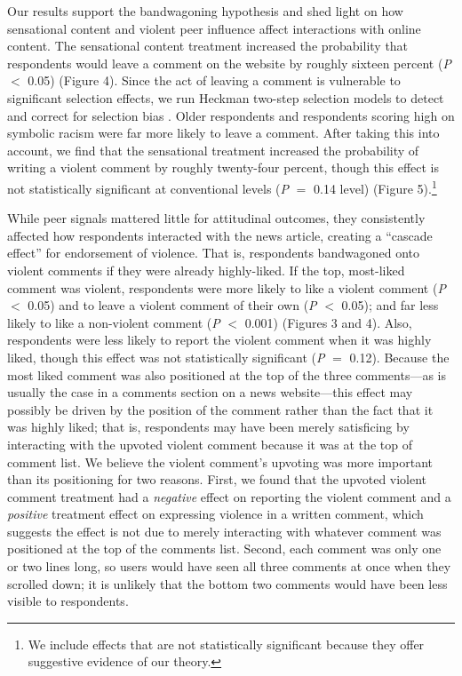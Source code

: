 \documentclass[12pt, letterpaper]{article}
\begin{document}
Our results support the bandwagoning hypothesis and shed light on how sensational content and violent peer influence affect interactions with online content. The sensational content treatment increased the probability that respondents would leave a comment on the website by roughly sixteen percent (\textit{P} $<$ 0.05) (Figure 4). Since the act of leaving a comment is vulnerable to significant selection effects, we run Heckman two-step selection models to detect and correct for selection bias \citep{heckman1979sample}. Older respondents and respondents scoring high on symbolic racism were far more likely to leave a comment. After taking this into account, we find that the sensational treatment increased the probability of writing a violent comment by roughly twenty-four percent, though this effect is not statistically significant at conventional levels (\textit{P} $=$ 0.14 level) (Figure 5).\footnote{We include effects that are not statistically significant because they offer suggestive evidence of our theory.}

While peer signals mattered little for attitudinal outcomes, they consistently affected how respondents interacted with the news article, creating a ``cascade effect'' \citep{bikhchandani1992theory} for endorsement of violence. That is, respondents bandwagoned onto violent comments if they were already highly-liked. If the top, most-liked comment was violent, respondents were more likely to like a violent comment (\textit{P} $<$ 0.05) and to leave a violent comment of their own (\textit{P} $<$ 0.05); and far less likely to like a non-violent comment (\textit{P} $<$ 0.001) (Figures 3 and 4). Also, respondents were less likely to report the violent comment when it was highly liked, though this effect was not statistically significant (\textit{P} $=$ 0.12). Because the most liked comment was also positioned at the top of the three comments---as is usually the case in a comments section on a news website---this effect may possibly be driven by the position of the comment rather than the fact that it was highly liked; that is, respondents may have been merely satisficing by interacting with the upvoted violent comment because it was at the top of comment list. We believe the violent comment's upvoting was more important than its positioning for two reasons. First, we found that the upvoted violent comment treatment had a \textit{negative} effect on reporting the violent comment and a \textit{positive} treatment effect on expressing violence in a written comment, which suggests the effect is not due to merely interacting with whatever comment was positioned at the top of the comments list. Second, each comment was only one or two lines long, so users would have seen all three comments at once when they scrolled down; it is unlikely that the bottom two comments would have been less visible to respondents.
\end{document}
